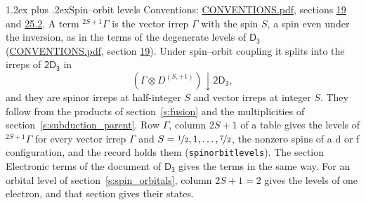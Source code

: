 \documentclass[10pt,a4paper]{article}
\makeatletter
\renewcommand\section{\@startsection{section}{1}{\z@}{-3ex plus -1ex minus -.2ex}%
  {1.2ex plus .2ex}{\normalfont\large\sffamily\bfseries\color{parttitle}}}
\numberwithin{equation}{section}
\newcommand{\grp}[1]{\mathsf{#1}}
\newcommand{\restr}[2]{#1\!\downarrow#2}
\newcommand{\irrJp}[2]{D^{(#1,#2)}}
\newcommand{\irrprod}{\otimes}
\newcommand{\term}[2]{{}^{#1}#2}
\makeatother
\begin{document}
\section{Spin--orbit levels}\label{s:spin_orbit}
Conventions: \href{../../CONVENTIONS.pdf}{CONVENTIONS.pdf}, sections \href{../../../rotation/CONVENTIONS.pdf\#conv.19}{19} and \href{../../CONVENTIONS.pdf\#conv.25.2}{25.2}.
\leavevmode\label{n:local.spin}\label{n:symbol.term}A term $\term{2S+1}{\Gamma}$ is the vector irrep $\Gamma$ with the spin $S$, a spin even under the inversion, as in the terms of the degenerate levels of \href{../../../rotation/data/pdf/D3.pdf}{$\grp{D_{3}}$} (\href{../../CONVENTIONS.pdf}{CONVENTIONS.pdf}, section \href{../../../rotation/CONVENTIONS.pdf\#conv.19}{19}). Under spin--orbit coupling it splits into the irreps of $\grp{2D_{3}}$ in
\begin{equation}\label{e:spinorbit}\restr{(\Gamma \irrprod \irrJp{S}{+1})}{\grp{2D_{3}}},\end{equation}
and they are spinor irreps at half-integer $S$ and vector irreps at integer $S$. They follow from the products of section~\ref{s:fusion} and the multiplicities of section~\ref{s:subduction_parent}. Row $\Gamma$, column $2S + 1$ of a table gives the levels of $\term{2S+1}{\Gamma}$ for every vector irrep $\Gamma$ and $S = \nicefrac{1}{2}, 1, \dots, \nicefrac{7}{2}$, the nonzero spins of a d or f configuration, and the record holds them (\texttt{spinorbitlevels}). The section Electronic terms of the document of \href{../../../rotation/data/pdf/D3.pdf}{$\grp{D_{3}}$} gives the terms in the same way. For an orbital level of section~\ref{s:spin_orbitals}, column $2S + 1 = 2$ gives the levels of one electron, and that section gives their states.
\end{document}
